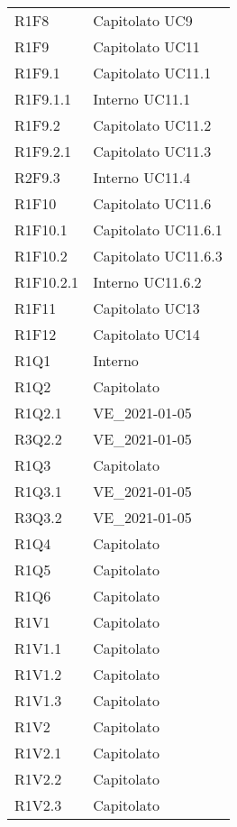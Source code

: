 {\begin{longtable}{C{3cm} C{12.5cm}}

R1F8 & Capitolato \quad UC9 \\


R1F9 & Capitolato \quad UC11 \\
R1F9.1 & Capitolato \quad UC11.1\\
R1F9.1.1 & Interno \quad UC11.1\\
R1F9.2 & Capitolato \quad UC11.2\\
R1F9.2.1 & Capitolato \quad UC11.3\\
R2F9.3 & Interno \quad UC11.4 \\


R1F10 & Capitolato \quad UC11.6\\
R1F10.1 & Capitolato \quad UC11.6.1\\
R1F10.2 & Capitolato \quad UC11.6.3\\
R1F10.2.1 & Interno \quad UC11.6.2 \\


R1F11 & Capitolato \quad UC13\\
R1F12 & Capitolato \quad UC14\\


R1Q1 & Interno \\
R1Q2 & Capitolato \\
R1Q2.1 & VE\_2021-01-05 \\
R3Q2.2 & VE\_2021-01-05 \\
R1Q3 & Capitolato \\
R1Q3.1 & VE\_2021-01-05 \\
R3Q3.2 & VE\_2021-01-05 \\
R1Q4 & Capitolato \\
R1Q5 & Capitolato \\
R1Q6 & Capitolato \\


R1V1 & Capitolato \\
R1V1.1 & Capitolato \\
R1V1.2 & Capitolato \\
R1V1.3 & Capitolato \\


R1V2 & Capitolato \\
R1V2.1 & Capitolato \\
R1V2.2 & Capitolato \\
R1V2.3 & Capitolato \\



\end{longtable}}
